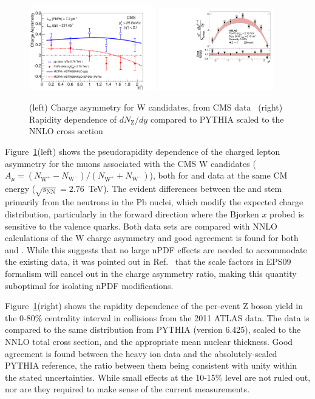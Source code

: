 \begin{figure}[!th]
\begin{center}
\includegraphics[width=0.49\textwidth]{electroweak_figs/Fig3.pdf}
\includegraphics[width=0.45\textwidth]{electroweak_figs/fig_02.pdf}
\caption[]{(left) Charge asymmetry for W candidates, from CMS data~\cite{Chatrchyan:2012nt} (right) Rapidity dependence of $dN_{\mathrm{Z}}/dy$ compared to PYTHIA scaled to the NNLO cross section~\cite{Aad:2012ew}}
\label{fig:pas:zw_eta}
\end{center}
\end{figure}
Figure~\ref{fig:pas:zw_eta}(left) shows the pseudorapidity dependence of the charged lepton asymmetry for the muons associated with
the CMS
W candidates ($A_\mu = (N_{\mathrm{W}^+}-N_{\mathrm{W}^-})/(N_{\mathrm{W}^+}+N_{\mathrm{W}^-})$), both for \PbPb and \pp data at the same CM energy
($\sqrt{s_\mathrm{NN}}=2.76$~TeV).  The evident differences between the \PbPb and \pp stem primarily from the neutrons in the
Pb nuclei, which modify the expected charge distribution, particularly in the forward direction where the Bjorken $x$ probed
is sensitive to the valence quarks.
Both data sets are compared with NNLO calculations of the W charge asymmetry and good agreement is found for both \pp and \PbPb.
While this suggests that no large nPDF effects are needed to accommodate the existing data, it was pointed out in Ref.~\cite{Paukkunen:2010qg}
that the scale factors in EPS09 formalism will cancel out in the charge asymmetry ratio, making this quantity suboptimal for
isolating nPDF modifications.

Figure~\ref{fig:pas:zw_eta}(right) shows the rapidity dependence of the per-event
Z boson yield in the 0-80\% centrality interval in \PbPb collisions
from the 2011 ATLAS \PbPb data.
The data is compared to the same distribution from PYTHIA (version 6.425), scaled to the NNLO total cross section,
and the appropriate mean nuclear thickness.
Good agreement is found between the heavy ion data and the absolutely-scaled PYTHIA reference, the ratio between them being consistent
with unity within the stated uncertainties.  
While small effects at the 10-15\% level are not ruled out, nor are they required to
make sense of the current measurements.

